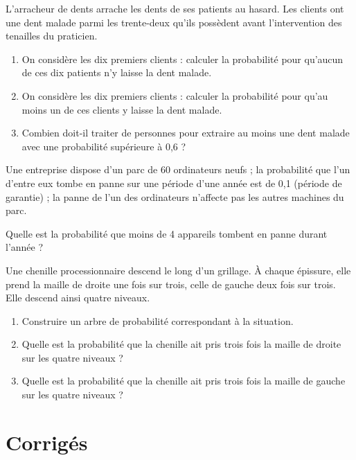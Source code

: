 \documentclass[french]{book}
\begin{document}
\begin{exocor}
L'arracheur de dents arrache les dents de ses patients au hasard. Les clients ont une dent malade parmi
les trente-deux qu'ils possèdent avant l'intervention des tenailles du praticien.

\begin{enumerate}
\item On considère les dix premiers clients : calculer la probabilité pour qu'aucun de ces dix patients n'y laisse la dent malade.
\item On considère les dix premiers clients : calculer la probabilité pour qu’au moins un de ces clients y laisse la dent malade.
\item Combien doit-il traiter de personnes pour extraire au moins une dent malade avec une probabilité
supérieure à 0,6 ?
\end{enumerate} 
\end{exocor}

\begin{exocor}
Une entreprise dispose d’un parc de 60 ordinateurs neufs ; la probabilité que l’un d’entre eux tombe en panne sur une période d’une année est de 0,1 (période de garantie) ; la panne de l’un des ordinateurs n’affecte pas les autres machines du parc.

Quelle est la probabilité que moins de 4 appareils tombent en panne durant l’année ? 
\end{exocor}

\begin{exocor}
Une chenille processionnaire descend le long d’un grillage. À chaque épissure, elle prend la maille de droite une fois sur trois, celle de gauche deux fois sur trois. Elle descend ainsi quatre niveaux.
\begin{enumerate}
\item Construire un arbre de probabilité correspondant à la situation.
\item Quelle est la probabilité que la chenille ait pris trois fois la maille de droite sur les quatre
niveaux ?
\item Quelle est la probabilité que la chenille ait pris trois fois la maille de gauche sur les quatre
niveaux ? 
\end{enumerate}
\end{exocor}
\newpage
\section{Corrigés}
\begin{corrige}
\end{corrige}
\end{document}
